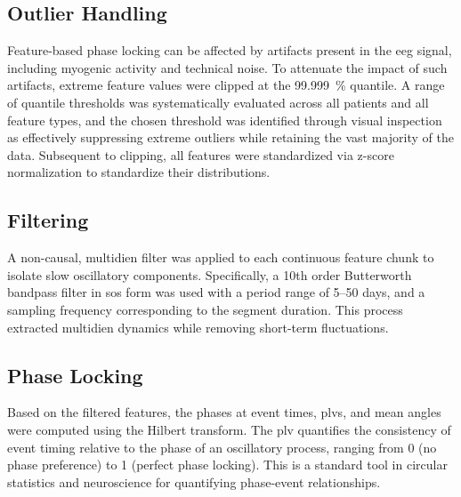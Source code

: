 \subsection{Outlier Handling} \label{subsec:cycle-outlier}
Feature-based phase locking can be affected by artifacts present in the \gls{eeg} signal, including myogenic activity and technical noise.
To attenuate the impact of such artifacts, extreme feature values were clipped at the \SI{99.999}{\percent} quantile.
A range of quantile thresholds was systematically evaluated across all patients and all feature types, and the chosen threshold was identified through visual inspection as effectively suppressing extreme outliers while retaining the vast majority of the data.
Subsequent to clipping, all features were standardized via z-score normalization to standardize their distributions.

\subsection{Filtering} \label{subsec:cycle-filtering}
A non-causal, multidien filter was applied to each continuous feature chunk to isolate slow oscillatory components.
Specifically, a 10th order Butterworth bandpass filter in \gls{sos} form was used with a period range of 5--50 days, and a sampling frequency corresponding to the segment duration.
This process extracted multidien dynamics while removing short-term fluctuations.

\subsection{Phase Locking} \label{subsec:phase-locking}
Based on the filtered features, the phases at event times, \glspl{plv}, and mean angles were computed using the Hilbert transform.
The \gls{plv} quantifies the consistency of event timing relative to the phase of an oscillatory process, ranging from 0 (no phase preference) to 1 (perfect phase locking).
This is a standard tool in circular statistics and neuroscience for quantifying phase-event relationships.

